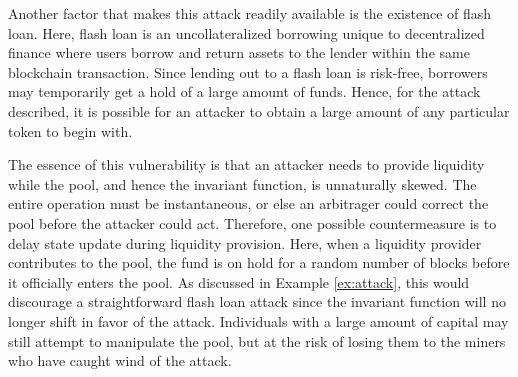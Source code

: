 \documentclass[12pt,a4paper]{article}
\begin{document}

Another factor that makes this attack readily available is the existence of flash loan. Here, flash loan is an uncollateralized borrowing unique to decentralized finance where users borrow and return assets to the lender within the same blockchain transaction. Since lending out to a flash loan is risk-free, borrowers may temporarily get a hold of a large amount of funds. Hence, for the attack described, it is possible for an attacker to obtain a large amount of any particular token to begin with.

The essence of this vulnerability is that an attacker needs to provide liquidity while the pool, and hence the invariant function, is unnaturally skewed. The entire operation must be instantaneous, or else an arbitrager could correct the pool before the attacker could act. Therefore, one possible countermeasure is to delay state update during liquidity provision. Here, when a liquidity provider contributes to the pool, the fund is on hold for a random number of blocks before it officially enters the pool. As discussed in Example \ref{ex:attack}, this would discourage a straightforward flash loan attack since the invariant function will no longer shift in favor of the attack. Individuals with a large amount of capital may still attempt to manipulate the pool, but at the risk of losing them to the miners who have caught wind of the attack.
\end{document}
